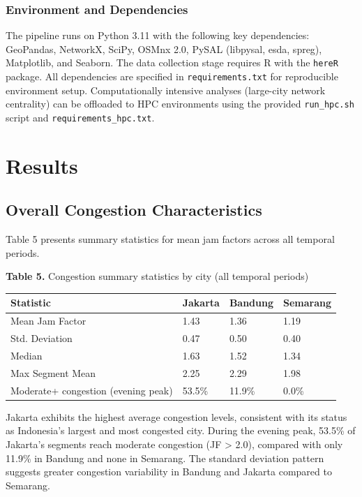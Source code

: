 \documentclass[12pt,a4paper]{article}
\begin{document}
\subsubsection{Environment and Dependencies}

The pipeline runs on Python 3.11 with the following key dependencies: GeoPandas, NetworkX, SciPy, OSMnx 2.0, PySAL (libpysal, esda, spreg), Matplotlib, and Seaborn. The data collection stage requires R with the \texttt{hereR} package. All dependencies are specified in \texttt{requirements.txt} for reproducible environment setup. Computationally intensive analyses (large-city network centrality) can be offloaded to HPC environments using the provided \texttt{run\_hpc.sh} script and \texttt{requirements\_hpc.txt}.



\section{Results}

\subsection{Overall Congestion Characteristics}

Table 5 presents summary statistics for mean jam factors across all temporal periods.

\textbf{Table 5.} Congestion summary statistics by city (all temporal periods)

\begin{longtable}[]{@{}llll@{}}
\toprule\noalign{}
Statistic & Jakarta & Bandung & Semarang \\
\midrule\noalign{}
\endhead
\bottomrule\noalign{}
\endlastfoot
Mean Jam Factor & 1.43 & 1.36 & 1.19 \\
Std. Deviation & 0.47 & 0.50 & 0.40 \\
Median & 1.63 & 1.52 & 1.34 \\
Max Segment Mean & 2.25 & 2.29 & 1.98 \\
Moderate+ congestion (evening peak) & 53.5\% & 11.9\% & 0.0\% \\
\end{longtable}

Jakarta exhibits the highest average congestion levels, consistent with its status as Indonesia's largest and most congested city. During the evening peak, 53.5\% of Jakarta's segments reach moderate congestion (JF > 2.0), compared with only 11.9\% in Bandung and none in Semarang. The standard deviation pattern suggests greater congestion variability in Bandung and Jakarta compared to Semarang.
\end{document}
